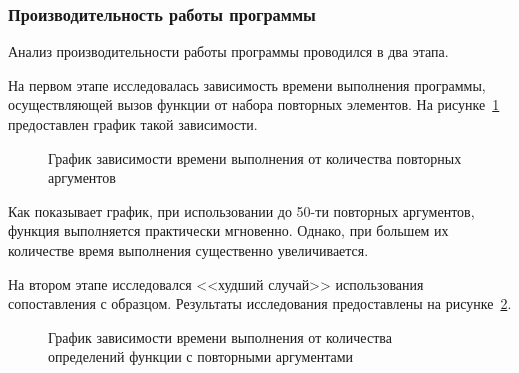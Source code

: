         \subsubsection{Производительность работы программы}
        Анализ производительности работы программы проводился в два этапа.
        
        На первом этапе исследовалась зависимость времени выполнения программы, осуществляющей вызов функции от набора повторных элементов.
        На рисунке~\ref{pic:workmatch} предоставлен график такой зависимости.
        \clearpage
        \begin{figure}[Ht!]
            \centering
            \caption{График зависимости времени выполнения от количества повторных аргументов}
            \label{pic:workmatch}
        \end{figure}

        Как показывает график, при использовании до 50-ти повторных аргументов, функция выполняется практически мгновенно.
        Однако, при большем их количестве время выполнения существенно увеличивается.

        На втором этапе исследовался <<худший случай>> использования сопоставления с образцом.
        Результаты исследования предоставлены на рисунке~\ref{pic:workworth}.
        \begin{figure}[ht!]
            \centering
            \caption{График зависимости времени выполнения от количества определений функции с повторными аргументами}
            \label{pic:workworth}
        \end{figure}

